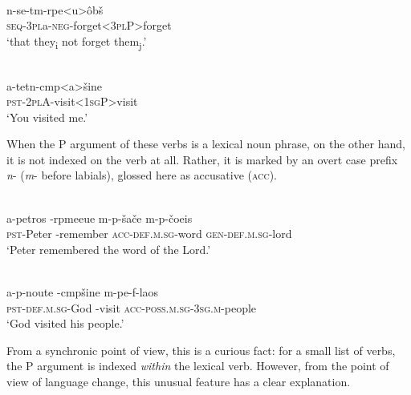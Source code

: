 \documentclass[output=paper]{LSP/langsci}
\begin{document}
\begin{exe}
\ex%
\label{05-gr-ex:3}
\\
\gll n-se-tm-rpe<u>ôbš\\
\textsc{seq-3pl}a\textsc{-neg}-forget<\textsc{3pl}P>forget\\
\glt ‘that they\textsubscript{i} not forget them\textsubscript{j}.’ %
\end{exe}

\begin{exe}
\ex%
\label{05-gr-ex:4}
\\ %
\gll a-tetn-cmp<a>šine\\
\textsc{pst-2pl}A-visit<\textsc{1sg}P>visit\\
\glt ‘You visited me.’ 
\end{exe}

When the P argument of these verbs is a lexical noun phrase, on the other hand, it is not indexed on the verb at all. Rather, it is marked by an overt case prefix \textit{n}- (\textit{m}- before labials), glossed here as accusative (\textsc{acc}).

\begin{exe}
\ex%
\label{05-gr-ex:5}
\\
\gll a-petros -rpmeeue m-p-šače m-p-čoeis\\
\textsc{pst}-Peter -remember \textsc{acc}-\textsc{def.m.sg}-word \textsc{gen-def.m.sg}-lord\\
\glt ‘Peter remembered the word of the Lord.’ %
\end{exe}

\begin{exe}
\ex%
\label{05-gr-ex:6}
\\
\gll a-p-noute -cmpšine m-pe-f-laos\\
\textsc{pst-def.m.sg}-God -visit \textsc{acc-poss.m.sg-3sg.m}-people\\
\glt ‘God visited his people.’ %
\end{exe}

From a synchronic point of view, this is a curious fact: for a small list of verbs, the P argument is indexed \textit{within} the lexical verb. However, from the point of view of language change, this unusual feature has a clear explanation. 
\end{document}
